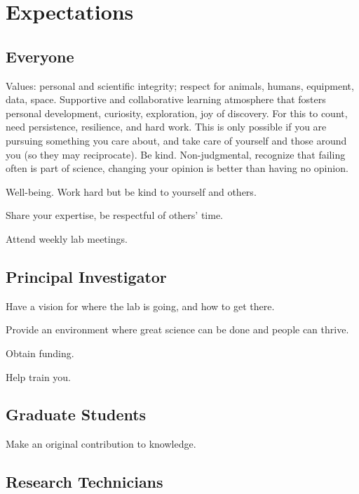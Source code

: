 \documentclass{tufte-book}
\begin{document}

\chapter{Expectations}\label{ch:expectations}

\section{Everyone}

Values: personal and scientific integrity; respect for animals,
humans, equipment, data, space. Supportive and collaborative learning
atmosphere that fosters personal development, curiosity, exploration,
joy of discovery. For this to count, need persistence, resilience, and
hard work. This is only possible if you are pursuing something you
care about, and take care of yourself and those around you (so they
may reciprocate). Be kind. Non-judgmental, recognize that failing
often is part of science, changing your opinion is better than having
no opinion.

Well-being. Work hard but be kind to yourself and others.

Share your expertise, be respectful of others' time.

Attend weekly lab meetings.


\section{Principal Investigator}

Have a vision for where the lab is going, and how to get there.

Provide an environment where great science can be done and people can thrive.

Obtain funding.

Help train you.

\section{Graduate Students}\label{sec:gradstudents}

Make an original contribution to knowledge.

\section{Research Technicians}
\end{document}
